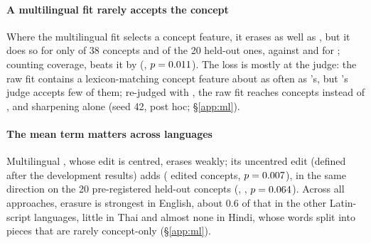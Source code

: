 \paragraph{A multilingual \ember{} fit rarely accepts the concept}
Where the multilingual \ember{} fit selects a concept feature, it erases as well as \cinderz{}, but it does so for only  of 38 concepts and  of the 20 held-out ones, against  and  for \cinder{}; counting coverage, \cinderz{} beats it by  (, $p = 0.011$).
The loss is mostly at the judge: the raw fit contains a lexicon-matching concept feature about as often as \cinder{}'s, but \ember{}'s judge accepts few of them; re-judged with \twj{}, the raw fit reaches  concepts instead of , and sharpening alone  (seed 42, post hoc; \S\ref{app:ml}).

\paragraph{The mean term matters across languages}
Multilingual \cinder{}, whose edit is centred, erases weakly; its uncentred \cinderz{} edit (defined after the development results) adds  ( edited concepts, $p = 0.007$), in the same direction on the 20 pre-registered held-out concepts (, , $p = 0.064$).
Across all approaches, erasure is strongest in English, about 0.6 of that in the other Latin-script languages, little in Thai and almost none in Hindi, whose words split into pieces that are rarely concept-only (\S\ref{app:ml}).

